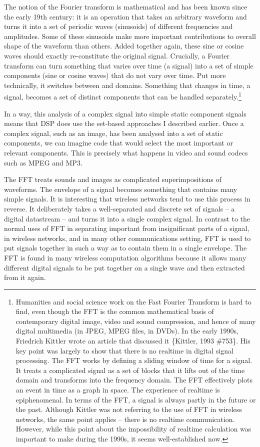 The notion of the Fourier transform is mathematical and has been known
since the early 19th century: it is an operation that
takes an arbitrary waveform and turns it into a set of periodic waves
(sinusoids) of different frequencies and amplitudes. Some of these
sinusoids make more important contributions to overall shape of the
waveform than others. Added together again, these sine or cosine waves
should exactly re{}-constitute the original signal. Crucially, a
Fourier transform can turn something that varies over time (a signal)
into a set of simple components (sine or cosine waves) that do not vary
over time. Put more technically, it switches between  and
 domains. Something that changes in time, a signal, becomes
a set of distinct components that can be handled
separately.\footnote{Humanities and social science work on the
Fast Fourier Transform is hard to find, even though the FFT is the
common mathematical basis of contemporary digital image, video and
sound compression, and hence of many digital multimedia (in JPEG, MPEG
files, in DVDs). In the early 1990s, Friedrich Kittler wrote an article
that discussed it \{Kittler, 1993 \#753\}. His key point was largely to
show that there is no realtime in digital signal processing. The FFT
works by defining a sliding window of time for a signal. It treats a
complicated signal as a set of blocks that it lifts out of the time
domain and transforms into the frequency domain. The FFT effectively
plots an event in time as a graph in space. The experience of realtime
is epiphenomenal. In terms of the FFT, a signal is always partly in the
future or the past. Although Kittler was not referring to the use of
FFT in wireless networks, the same point applies {--} there is no
realtime communication. However, while this point about the
impossibility of realtime calculation was important to make during the
1990s, it seems well{}-established now.}

In a way, this analysis of a
complex signal into simple static component signals means that DSP does
use the set{}-based approaches I described earlier. Once a complex
signal, such as an image, has been analysed into a set of static
components, we can imagine code that would select the most important or
relevant components. This is precisely what happens in video and sound
codecs such as MPEG and MP3.

The FFT treats sounds and images as complicated superimpositions of
waveforms. The envelope of a signal becomes something that contains
many simple signals. It is interesting that wireless networks tend to
use this process in reverse. It deliberately takes a well{}-separated
and discrete set of signals {--} a digital datastream {--} and turns it
into a single complex signal. In contrast to the normal uses of FFT in
separating important from insignificant parts of a signal, in wireless
networks, and in many other communications setting, FFT is used to put
signals together in such a way as to contain them in a single envelope.
The FFT is found in many wireless computation algorithms because it
allows many different digital signals to be put together on a single
wave and then extracted from it again. 

